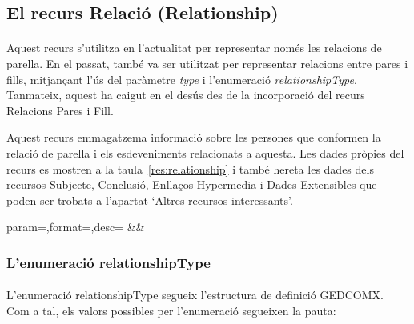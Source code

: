 \subsection{El recurs Relació (Relationship)}

    \paragraph{}
    Aquest recurs s'utilitza en l'actualitat per representar només les relacions de pa\-re\-lla. En el passat, també va ser utilitzat per representar relacions entre pares i fills, mitjançant l'ús del paràmetre \emph{type} i l'enumeració \emph{relationshipType}. Tanmateix, aquest ha caigut en el desús des de la incorporació del recurs Relacions Pares i Fill.

    Aquest recurs emmagatzema informació sobre les persones que conformen la relació de parella i els esdeveniments relacionats a aquesta. Les dades pròpies del recurs es mostren a la taula~\ref{res:relationship} i també hereta les dades dels recursos Subjecte, Conclusió, Enllaços Hypermedia i Dades Extensibles que poden ser trobats a l'apartat `Altres recursos interessants'.

    \begin{center}
             {param=\param,format=\format,desc=\desc}
             {\param&\format&\desc}
     \end{center}


    \subsubsection{L'enumeració relationshipType}

    \paragraph{}
    L'enumeració relationshipType segueix l'estructura de definició GEDCOMX. Com a tal, els valors possibles per l'enumeració segueixen la pauta:

